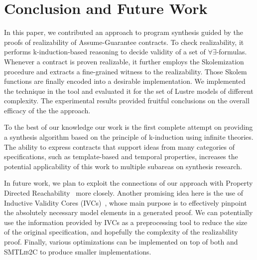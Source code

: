 \section{Conclusion and Future Work}
\label{sec:conclusion}

In this paper, we contributed an approach to program synthesis guided by the
proofs of realizability of Assume-Guarantee contracts.
To check realizability, it performs k-induction-based reasoning to decide validity of a set of $\forall\exists$-formulas.
Whenever a contract is proven realizable, it further employs the Skolemization procedure and extracts a fine-grained witness to the realizability.
Those Skolem functions are finally encoded into a desirable implementation.
We implemented the technique in the \jsynvg tool and evaluated it for the set
of Lustre models of different complexity.
The experimental results provided fruitful conclusions on the overall efficacy of the the approach.

To the best of our knowledge our work is the first complete attempt on providing
a synthesis algorithm based on the principle of k-induction using infinite
theories. The ability to express contracts that support ideas from many
categories of specifications, such as template-based and temporal properties,
increases the potential applicability of this work to multiple subareas on
synthesis research.

In future work, we plan to exploit the connections of our approach with
Property Directed Reachability~\cite{komuravelli2014smt} more closely. %
Another promising idea here is the use of Inductive Validity Cores (IVCs)~\cite{Ghass16}, whose main purpose is to effectively pinpoint the absolutely necessary model elements in a generated proof. We can potentially use
the information provided by IVCs as a preprocessing tool to reduce the size of
the original specification, and hopefully the complexity of the realizability
proof. Finally, various optimizations can be implemented on top of both
\aeval and \textsc{SMTLib2C} to produce smaller implementations.